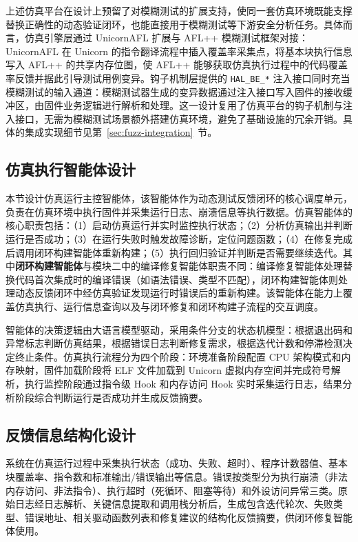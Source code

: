 上述仿真平台在设计上预留了对模糊测试的扩展支持，使同一套仿真环境既能支撑替换正确性的动态验证闭环，也能直接用于模糊测试等下游安全分析任务。具体而言，仿真引擎层通过 UnicornAFL 扩展与 AFL++ 模糊测试框架对接：UnicornAFL 在 Unicorn 的指令翻译流程中插入覆盖率采集点，将基本块执行信息写入 AFL++ 的共享内存位图，使 AFL++ 能够获取仿真执行过程中的代码覆盖率反馈并据此引导测试用例变异。钩子机制层提供的 \texttt{HAL\_BE\_*} 注入接口同时充当模糊测试的输入通道：模糊测试器生成的变异数据通过注入接口写入固件的接收缓冲区，由固件业务逻辑进行解析和处理。这一设计复用了仿真平台的钩子机制与注入接口，无需为模糊测试场景额外搭建仿真环境，避免了基础设施的冗余开销。具体的集成实现细节见第~\ref{sec:fuzz-integration}~节。

\subsection{仿真执行智能体设计}

本节设计仿真运行主控智能体，该智能体作为动态测试反馈闭环的核心调度单元，负责在仿真环境中执行固件并采集运行日志、崩溃信息等执行数据。仿真智能体的核心职责包括：（1）启动仿真运行并实时监控执行状态；（2）分析仿真输出并判断运行是否成功；（3）在运行失败时触发故障诊断，定位问题函数；（4）在修复完成后调用闭环构建智能体重新构建；（5）执行回归验证并判断是否需要继续迭代。其中\textbf{闭环构建智能体}与模块二中的编译修复智能体职责不同：编译修复智能体处理替换代码首次集成时的编译错误（如语法错误、类型不匹配），闭环构建智能体则处理动态反馈闭环中经仿真验证发现运行时错误后的重新构建。该智能体在能力上覆盖仿真执行、运行信息查询以及与闭环修复和闭环构建子流程的交互调度。

智能体的决策逻辑由大语言模型驱动，采用条件分支的状态机模型：根据退出码和异常标志判断仿真结果，根据错误日志判断修复需求，根据迭代计数和停滞检测决定终止条件。仿真执行流程分为四个阶段：环境准备阶段配置 CPU 架构模式和内存映射，固件加载阶段将 ELF 文件加载到 Unicorn 虚拟内存空间并完成符号解析，执行监控阶段通过指令级 Hook 和内存访问 Hook 实时采集运行日志，结果分析阶段综合判断运行是否成功并生成反馈摘要。

\subsection{反馈信息结构化设计}

系统在仿真运行过程中采集执行状态（成功、失败、超时）、程序计数器值、基本块覆盖率、指令数和标准输出/错误输出等信息。错误按类型分为执行崩溃（非法内存访问、非法指令）、执行超时（死循环、阻塞等待）和外设访问异常三类。原始日志经日志解析、关键信息提取和调用栈分析后，生成包含迭代轮次、失败类型、错误地址、相关驱动函数列表和修复建议的结构化反馈摘要，供闭环修复智能体使用。

